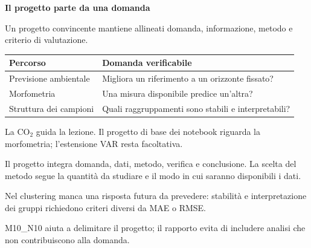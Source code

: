 \documentclass[12pt,aspectratio=1610]{beamer}
\newcommand{\PBody}[1]{\par{\fontsize{11.3}{14.8}\selectfont #1\par}}
\newcommand{\PSmall}[1]{\par{\fontsize{9.8}{13.1}\selectfont #1\par}}
\newcommand{\PInfo}[1]{%
\begin{tcolorbox}[enhanced,arc=1.6mm,boxrule=.55pt,colback=GeoTint,
 colframe=Rule!80!Classical,left=2.3mm,right=2.3mm,top=2mm,bottom=2mm,
 before skip=1mm,after skip=1mm]
\PSmall{#1}\end{tcolorbox}}
\begin{document}
\begin{frame}[plain]\hypertarget{slide102}{}
\begin{lrbox}{\TitleBox}
\begin{minipage}[t]{17.7cm}\raggedright\color{Ink}\fontsize{11.3}{14.8}\selectfont
\color{Navy}\bfseries\fontsize{20.6}{24.5}\selectfont Il progetto parte da una domanda
\end{minipage}\end{lrbox}

\begin{lrbox}{\RecallBox}
\begin{minipage}[t]{14.3cm}\raggedright\color{Ink}\fontsize{11.3}{14.8}\selectfont
\fontsize{10.3}{13.8}\selectfont Un progetto convincente mantiene allineati domanda, informazione, metodo e criterio di valutazione.
\end{minipage}\end{lrbox}

\begin{lrbox}{\PilotLeftBox}
\begin{minipage}[t]{10.05cm}\raggedright\color{Ink}\fontsize{11.3}{14.8}\selectfont
{\fontsize{10.2}{13.1}\selectfont\renewcommand{\arraystretch}{1.45}\begin{tabular}{@{}p{3.7cm}p{5.4cm}@{}}\toprule
\textbf{Percorso} & \textbf{Domanda verificabile}\\\midrule
Previsione ambientale & Migliora un riferimento a un orizzonte fissato?\\
Morfometria & Una misura disponibile predice un’altra?\\
Struttura dei campioni & Quali raggruppamenti sono stabili e interpretabili?\\
\bottomrule\end{tabular}}
\PInfo{La CO$_2$ guida la lezione. Il progetto di base dei notebook riguarda la morfometria; l’estensione VAR resta facoltativa.}

\end{minipage}\end{lrbox}

\begin{lrbox}{\PilotRightBox}
\begin{minipage}[t]{7.55cm}\raggedright\color{Ink}\fontsize{11.3}{14.8}\selectfont
\PBody{Il progetto integra domanda, dati, metodo, verifica e conclusione. La scelta del metodo segue la quantità da studiare e il modo in cui saranno disponibili i dati.}
\vspace{2.5mm}
\PInfo{Nel clustering manca una risposta futura da prevedere: stabilità e interpretazione dei gruppi richiedono criteri diversi da MAE o RMSE.}
\PSmall{M10\_N10 aiuta a delimitare il progetto; il rapporto evita di includere analisi che non contribuiscono alla domanda.}


\end{minipage}
\end{lrbox}
\end{frame}
\end{document}

